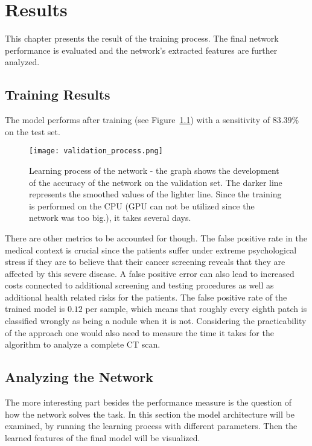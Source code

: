 \documentclass[main.tex]{subfiles}
\begin{document}
\chapter{Results}\label{chap:results}
This chapter presents the result of the training process. The final network performance is evaluated and the network's extracted features are further analyzed.

\section{Training Results}
The model performs after training (see Figure~\ref{fig:validation}) with a sensitivity of $83.39\%$ on the test set.

\begin{figure}[H]
\begin{center}
\texttt{[image: validation\_process.png]}
\end{center}
\caption{Learning process of the network - the graph shows the development of the accuracy of the network on the validation set. The darker line represents the smoothed values of the lighter line. Since the training is performed on the CPU (GPU can not be utilized since the network was too big.), it takes several days.}
\label{fig:validation}
\end{figure}

There are other metrics to be accounted for though. The false positive rate in the medical context is crucial since the patients suffer under extreme psychological stress if they are to believe that their cancer screening reveals that they are affected by this severe disease. A false positive error can also lead to increased costs connected to additional screening and testing procedures as well as additional health related risks for the patients. The false positive rate of the trained model is $0.12$ per sample, which means that roughly every eighth patch is classified wrongly as being a nodule when it is not. Considering the practicability of the approach one would also need to measure the time it takes for the algorithm to analyze a complete CT scan.


\section{Analyzing the Network}
The more interesting part besides the performance measure is the question of how the network solves the task. In this section the model architecture will be examined, by running the learning process with different parameters. Then the learned features of the final model will be visualized.
\end{document}
